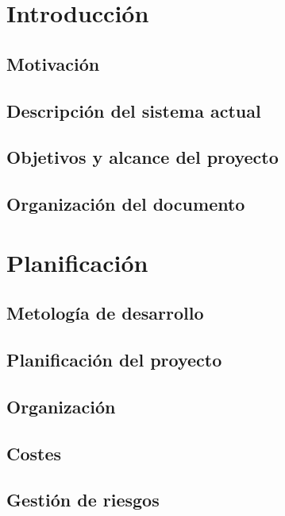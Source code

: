 \section{Introducción}
\subsection{Motivación}
	
\subsection{Descripción del sistema actual}
	
\subsection{Objetivos y alcance del proyecto}
	
\subsection{Organización del documento}
\newpage
\section{Planificación}
\subsection{Metología de desarrollo}
	
\subsection{Planificación del proyecto}
	
\subsection{Organización}
    	
\subsection{Costes}
\subsection{Gestión de riesgos}